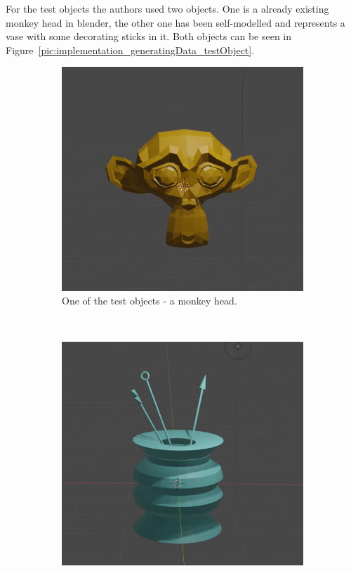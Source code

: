 For the test objects the authors used two objects. One is a already existing monkey head in blender, the other one has been self-modelled and represents a vase with some decorating sticks in it. Both objects can be seen in Figure~\ref{pic:implementation_generatingData_testObject}.

\begin{figure}[h!]
	\centering
	\begin{subfigure}[t]{0.4\textwidth}
		\centering
		\includegraphics[width=\textwidth]{img/implementation_generatingData_testObject1.jpg}
		\caption{One of the test objects - a monkey head.}
	\end{subfigure}%
	~ 
	\begin{subfigure}[t]{0.4\textwidth}
		\centering
		\includegraphics[width=\textwidth]{img/implementation_generatingData_testObject2.jpg}

\end{subfigure}
\end{figure}
